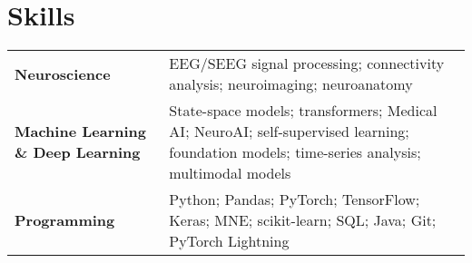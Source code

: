 \section*{Skills}

\begin{tabularx}{\linewidth}{@{}l X@{}}
	\textbf{Neuroscience} & EEG/SEEG signal processing; connectivity analysis; neuroimaging; neuroanatomy \\
    
	\textbf{Machine Learning \& Deep Learning} & State-space models; transformers; Medical AI; NeuroAI; self-supervised learning; foundation models; time-series analysis; multimodal models \\
    
	\textbf{Programming} & Python; Pandas; PyTorch; TensorFlow; Keras; MNE; scikit-learn; SQL; Java; Git; PyTorch Lightning \\
\end{tabularx}